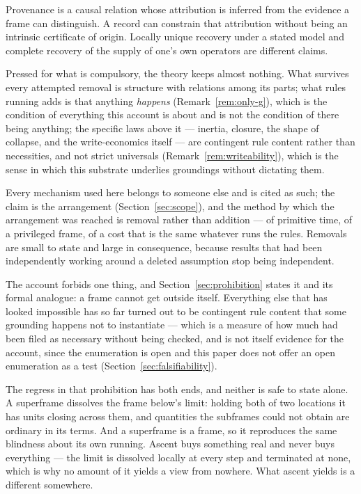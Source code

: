 \documentclass[11pt,a4paper]{article}
\theoremstyle{remark}\newtheorem{remark}[definition]{Remark}
\begin{document}
Provenance is a causal relation whose attribution is inferred from the
evidence a frame can distinguish. A record can constrain that attribution
without being an intrinsic certificate of origin. Locally unique recovery
under a stated model and complete recovery of the supply of one's own
operators are different claims.

Pressed for what is compulsory, the theory keeps almost nothing. What survives every attempted removal is structure with relations among its parts; what rules running adds is that anything \emph{happens} (Remark~\ref{rem:only-g}), which is the condition of everything this account is about and is not the condition of there being anything; the specific laws above it --- inertia, closure, the shape of collapse, and the write-economics itself --- are contingent rule content rather than necessities, and not strict universals (Remark~\ref{rem:writeability}), which is the sense in which this substrate underlies groundings without dictating them.

Every mechanism used here belongs to someone else and is cited as such; the claim is the arrangement (Section~\ref{sec:scope}), and the method by which the arrangement was reached is removal rather than addition --- of primitive time, of a privileged frame, of a cost that is the same whatever runs the rules. Removals are small to state and large in consequence, because results that had been independently working around a deleted assumption stop being independent.

The account forbids one thing, and Section~\ref{sec:prohibition} states it and its formal analogue: a frame cannot get outside itself. Everything else that has looked impossible has so far turned out to be contingent rule content that some grounding happens not to instantiate --- which is a measure of how much had been filed as necessary without being checked, and is not itself evidence for the account, since the enumeration is open and this paper does not offer an open enumeration as a test (Section~\ref{sec:falsifiability}).

The regress in that prohibition has both ends, and neither is safe to state alone. A superframe dissolves the frame below's limit: holding both of two locations it has units closing across them, and quantities the subframes could not obtain are ordinary in its terms. And a superframe is a frame, so it reproduces the same blindness about its own running. Ascent buys something real and never buys everything --- the limit is dissolved locally at every step and terminated at none, which is why no amount of it yields a view from nowhere. What ascent yields is a different somewhere.
\end{document}
